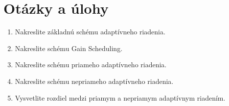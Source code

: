\documentclass[a4paper, 10pt, ]{article}
\begin{document}
\section{Otázky a úlohy}

\begin{enumerate}[leftmargin=0pt, labelsep=4mm, itemsep=0pt]
	\item Nakreslite základnú schému adaptívneho riadenia.
	\item Nakreslite schému Gain Scheduling.
	\item Nakreslite schému priameho adaptívneho riadenia.
	\item Nakreslite schému nepriameho adaptívneho riadenia.
	\item Vysvetlite rozdiel medzi priamym a nepriamym adaptívnym riadením.
\end{enumerate}
\end{document}
